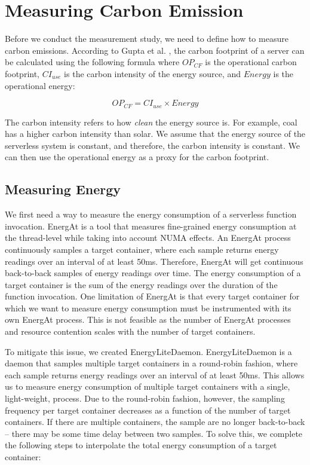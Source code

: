 \documentclass[times, 10pt,twocolumn]{article}
\begin{document}
\section{Measuring Carbon Emission}


Before we conduct the measurement study, we need to define how to measure carbon emissions. According to Gupta et al. \cite{gupta2022act}, the carbon footprint of a server can be calculated using the following formula where $OP_{CF}$ is the operational carbon footprint, $CI_{use}$ is the carbon intensity of the energy source, and $Energy$ is the operational energy:

\begin{equation}
   OP_{CF} = CI_{use} \times Energy
\end{equation}

The carbon intensity refers to how \textit{clean} the energy source is. For example, coal has a higher carbon intensity than solar. We assume that the energy source of the serverless system is constant, and therefore, the carbon intensity is constant. We can then use the operational energy as a proxy for the carbon footprint.

\subsection{Measuring Energy}
We first need a way to measure the energy consumption of a serverless function invocation. EnergAt \cite{he2023hotcarbon} is a tool that measures fine-grained energy consumption at the thread-level while taking into account NUMA effects. An EnergAt process continuously samples a target container, where each sample returns energy readings over an interval of at least 50ms. Therefore, EnergAt will get continuous back-to-back samples of energy readings over time. The energy consumption of a target container is the sum of the energy readings over the duration of the function invocation. One limitation of EnergAt is that every target container for which we want to measure energy consumption must be instrumented with its own EnergAt process. This is not feasible as the number of EnergAt processes and resource contention scales with the number of target containers.

To mitigate this issue, we created EnergyLiteDaemon. EnergyLiteDaemon is a daemon that samples multiple target containers in a round-robin fashion, where each sample returns energy readings over an interval of at least 50ms. This allows us to measure energy consumption of multiple target containers with a single, light-weight, process. Due to the round-robin fashion, however, the sampling frequency per target container decreases as a function of the number of target containers. If there are multiple containers, the sample are no longer back-to-back -- there may be some time delay between two samples. To solve this, we complete the following steps to interpolate the total energy consumption of a target container:
\end{document}
